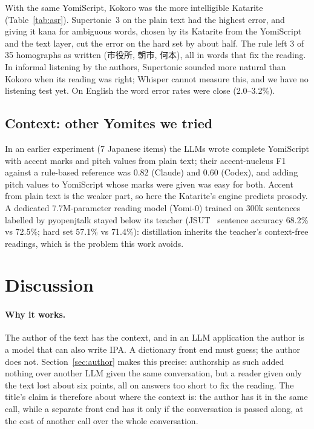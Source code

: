 \documentclass[11pt,a4paper]{article}
\begin{document}
With the same YomiScript, Kokoro was the more intelligible Katarite (Table~\ref{tab:asr}). Supertonic~3 on the plain
text had the highest error, and giving it kana for ambiguous words, chosen by its Katarite from the YomiScript and the
text layer, cut the error on the hard set by about half. The rule left 3 of 35 homographs as written (市役所, 朝市,
何本), all in words that fix the reading. In informal listening by the authors, Supertonic sounded more natural than
Kokoro when its reading was right; Whisper cannot measure this, and we have no listening test yet. On English the word
error rates were close (2.0--3.2\%).

\subsection{Context: other Yomites we tried}

In an earlier experiment (7 Japanese items) the LLMs wrote complete YomiScript with accent marks and pitch values from
plain text; their accent-nucleus F1 against a rule-based reference was 0.82 (Claude) and 0.60 (Codex), and adding pitch
values to YomiScript whose marks were given was easy for both. Accent from plain text is the weaker part, so here the
Katarite's engine predicts prosody. A dedicated 7.7M-parameter reading model (Yomi-0) trained on
300k sentences labelled by pyopenjtalk stayed below its teacher (JSUT~\citep{sonobe2017jsut,jsutlabel} sentence
accuracy 68.2\% vs 72.5\%; hard set 57.1\% vs 71.4\%): distillation inherits the teacher's context-free readings, which
is the problem this work avoids.

\section{Discussion}

\paragraph{Why it works.} The author of the text has the context, and in an LLM application the author is a model that
can also write IPA. A dictionary front end must guess; the author does not. Section~\ref{sec:author} makes this
precise: authorship as such added nothing over another LLM given the same conversation, but a reader given only the
text lost about six points, all on answers too short to fix the reading. The title's claim is therefore about where
the context is: the author has it in the same call, while a separate front end has it only if the conversation is
passed along, at the cost of another call over the whole conversation.
\end{document}
